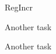 
\section[{\it Hands-On} RegIncr]{}

\begin{frame}{RegIncr}
\end{frame}

\begin{task}
\begin{frame}{Another task}

\end{frame}
\end{task}

\begin{task}
\begin{frame}{Another task}

\end{frame}
\end{task}

